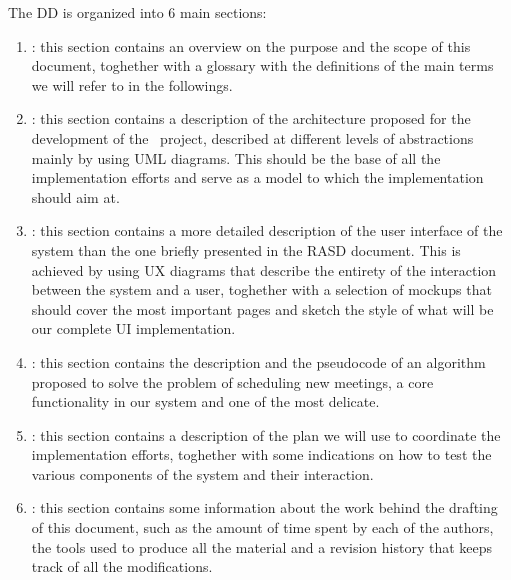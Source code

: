 The DD is organized into 6 main sections:

\begin{enumerate}
\item {\textbf{}}: this section contains an overview on the purpose and the scope of this document, toghether with a glossary with the definitions of the main terms we will refer to in the followings.
\item {\textbf{}}: this section contains a description of the architecture proposed for the development of the \projectname~project, described at different levels of abstractions mainly by using UML diagrams. This should be the base of all the implementation efforts and serve as a model to which the implementation should aim at.
\item {\textbf{}}: this section contains a more detailed description of the user interface of the system than the one briefly presented in the RASD document. This is achieved by using UX diagrams that describe the entirety of the interaction between the system and a user, toghether with a selection of mockups that should cover the most important pages and sketch the style of what will be our complete UI implementation.
\item {\textbf{}}: this section contains the description and the pseudocode of an algorithm proposed to solve the problem of scheduling new meetings, a core functionality in our system and one of the most delicate.
\item {\textbf{}}: this section contains a description of the plan we will use to coordinate the implementation efforts, toghether with some indications on how to test the various components of the system and their interaction.
\item {\textbf{}}: this section contains some information about the work behind the drafting of this
document, such as the amount of time spent by each of the authors, the tools used to produce all
the material and a revision history that keeps track of all the modifications.
\end{enumerate}
